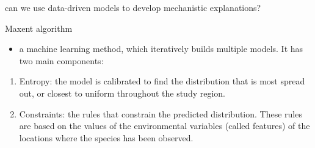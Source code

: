 \documentclass[
  ignorenonframetext,
]{beamer}
\providecommand{\tightlist}{%
  \setlength{\itemsep}{0pt}\setlength{\parskip}{0pt}}
\begin{document}
\begin{frame}{can we use data-driven models to develop mechanistic
explanations?}
\protect\hypertarget{can-we-use-data-driven-models-to-develop-mechanistic-explanations}{}
\begin{block}{Maxent algorithm}
\protect\hypertarget{maxent-algorithm}{}
\begin{itemize}
\tightlist
\item
  a machine learning method, which iteratively builds multiple models.
  It has two main components:
\end{itemize}

\begin{enumerate}
\item
  Entropy: the model is calibrated to find the distribution that is most
  spread out, or closest to uniform throughout the study region.
\item
  Constraints: the rules that constrain the predicted distribution.
  These rules are based on the values of the environmental variables
  (called features) of the locations where the species has been
  observed.
\end{enumerate}


\end{block}
\end{frame}
\end{document}

